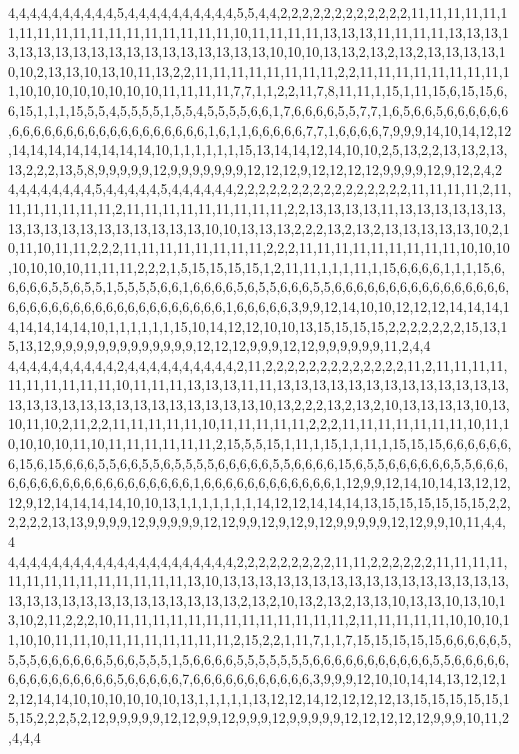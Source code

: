 4,4,4,4,4,4,4,4,4,4,5,4,4,4,4,4,4,4,4,4,4,5,5,4,4,2,2,2,2,2,2,2,2,2,2,2,2,11,11,11,11,11,11,11,11,11,11,11,11,11,11,11,11,11,11,10,11,11,11,11,13,13,13,11,11,11,11,13,13,13,13,13,13,13,13,13,13,13,13,13,13,13,13,13,13,10,10,10,13,13,2,13,2,13,2,13,13,13,13,10,10,2,13,13,10,13,10,11,13,2,2,11,11,11,11,11,11,11,11,2,2,11,11,11,11,11,11,11,11,11,10,10,10,10,10,10,10,10,11,11,11,11,7,7,1,1,2,2,11,7,8,11,11,1,15,1,11,15,6,15,15,6,6,15,1,1,1,15,5,5,4,5,5,5,5,1,5,5,4,5,5,5,5,6,6,1,7,6,6,6,6,5,5,7,7,1,6,5,6,6,5,6,6,6,6,6,6,6,6,6,6,6,6,6,6,6,6,6,6,6,6,6,6,6,6,1,6,1,1,6,6,6,6,6,7,7,1,6,6,6,6,7,9,9,9,14,10,14,12,12,14,14,14,14,14,14,14,14,10,1,1,1,1,1,1,15,13,14,14,12,14,10,10,2,5,13,2,2,13,13,2,13,13,2,2,2,13,5,8,9,9,9,9,9,12,9,9,9,9,9,9,9,12,12,12,9,12,12,12,12,9,9,9,9,12,9,12,2,4,2
4,4,4,4,4,4,4,4,5,4,4,4,4,4,5,4,4,4,4,4,4,2,2,2,2,2,2,2,2,2,2,2,2,2,2,2,2,11,11,11,11,2,11,11,11,11,11,11,11,2,11,11,11,11,11,11,11,11,11,2,2,13,13,13,13,11,13,13,13,13,13,13,13,13,13,13,13,13,13,13,13,13,13,10,10,13,13,13,2,2,2,13,2,13,2,13,13,13,13,13,10,2,10,11,10,11,11,2,2,2,11,11,11,11,11,11,11,11,2,2,2,11,11,11,11,11,11,11,11,11,10,10,10,10,10,10,10,11,11,11,2,2,2,1,5,15,15,15,15,1,2,11,11,1,1,1,11,1,15,6,6,6,6,1,1,1,15,6,6,6,6,6,5,5,6,5,5,1,5,5,5,5,6,6,1,6,6,6,6,5,6,5,5,6,6,6,5,5,6,6,6,6,6,6,6,6,6,6,6,6,6,6,6,6,6,6,6,6,6,6,6,6,6,6,6,6,6,6,6,6,6,6,6,6,1,6,6,6,6,6,3,9,9,12,14,10,10,12,12,12,14,14,14,14,14,14,14,14,10,1,1,1,1,1,1,15,10,14,12,12,10,10,13,15,15,15,15,2,2,2,2,2,2,2,15,13,15,13,12,9,9,9,9,9,9,9,9,9,9,9,9,9,12,12,12,9,9,9,12,12,9,9,9,9,9,9,11,2,4,4
4,4,4,4,4,4,4,4,4,4,2,4,4,4,4,4,4,4,4,4,4,2,11,2,2,2,2,2,2,2,2,2,2,2,2,2,11,2,11,11,11,11,11,11,11,11,11,11,10,11,11,11,13,13,13,11,11,13,13,13,13,13,13,13,13,13,13,13,13,13,13,13,13,13,13,13,13,13,13,13,13,13,13,13,10,13,2,2,2,13,2,13,2,10,13,13,13,13,10,13,10,11,10,2,11,2,2,11,11,11,11,11,10,11,11,11,11,11,2,2,2,11,11,11,11,11,11,11,10,11,10,10,10,10,11,10,11,11,11,11,11,11,2,15,5,5,15,1,11,1,15,1,1,11,1,15,15,15,6,6,6,6,6,6,6,15,6,15,6,6,6,5,5,6,6,5,5,6,5,5,5,5,6,6,6,6,6,5,5,6,6,6,6,15,6,5,5,6,6,6,6,6,6,5,5,6,6,6,6,6,6,6,6,6,6,6,6,6,6,6,6,6,6,6,6,1,6,6,6,6,6,6,6,6,6,6,6,6,1,12,9,9,12,14,10,14,13,12,12,12,9,12,14,14,14,14,10,10,13,1,1,1,1,1,1,1,14,12,12,14,14,14,13,15,15,15,15,15,15,2,2,2,2,2,2,13,13,9,9,9,9,12,9,9,9,9,9,12,12,9,9,12,9,12,9,12,9,9,9,9,9,12,12,9,9,10,11,4,4,4
4,4,4,4,4,4,4,4,4,4,4,4,4,4,4,4,4,4,4,4,4,2,2,2,2,2,2,2,2,2,11,11,2,2,2,2,2,2,11,11,11,11,11,11,11,11,11,11,11,11,11,11,13,10,13,13,13,13,13,13,13,13,13,13,13,13,13,13,13,13,13,13,13,13,13,13,13,13,13,13,13,13,13,2,13,2,10,13,2,13,2,13,13,10,13,13,10,13,10,13,10,2,11,2,2,2,10,11,11,11,11,11,11,11,11,11,11,11,11,11,2,11,11,11,11,11,10,10,10,11,10,10,11,11,10,11,11,11,11,11,11,11,2,15,2,2,1,11,7,1,1,7,15,15,15,15,15,6,6,6,6,6,5,5,5,5,6,6,6,6,6,6,5,6,6,5,5,5,1,5,6,6,6,6,5,5,5,5,5,5,5,6,6,6,6,6,6,6,6,6,6,6,5,5,6,6,6,6,6,6,6,6,6,6,6,6,6,6,6,5,6,6,6,6,6,7,6,6,6,6,6,6,6,6,6,6,6,3,9,9,9,12,10,10,14,14,13,12,12,12,12,14,14,10,10,10,10,10,10,13,1,1,1,1,1,13,12,12,14,12,12,12,12,13,15,15,15,15,15,15,15,2,2,2,5,2,12,9,9,9,9,9,12,12,9,9,12,9,9,9,12,9,9,9,9,9,12,12,12,12,12,9,9,9,10,11,2,4,4,4
